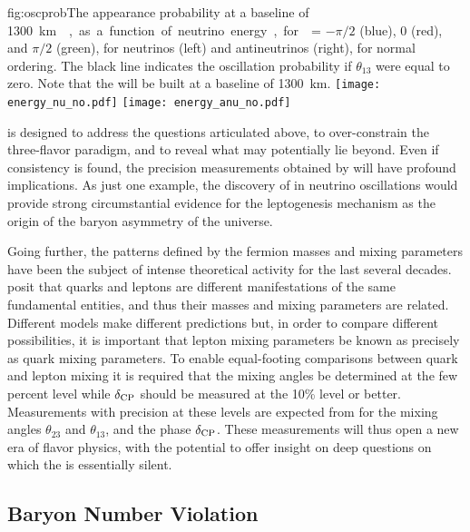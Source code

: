 \begin{dunefigure}{fig:oscprob}{The appearance probability at a baseline of \SI{1300}\km{},
  as a function of neutrino energy, for \deltacp = $-\pi/2$ (blue), 
  0 (red), and $\pi/2$ (green), for neutrinos (left) and antineutrinos
  (right), for normal ordering. The black line indicates the oscillation
  probability if $\theta_{13}$ were equal to zero. Note that the   will be built at a baseline of \SI{1300}{\km}.}
\texttt{[image: energy\_nu\_no.pdf]}
\texttt{[image: energy\_anu\_no.pdf]}
\end{dunefigure}



 is designed to address the questions articulated above, 
to over-constrain the three-flavor paradigm, 
and to reveal what may potentially lie beyond.  
Even if consistency is found, the precision measurements 
obtained by  will have profound implications. As just one example, 
the discovery of  in neutrino oscillations would provide 
strong circumstantial evidence for the leptogenesis mechanism as 
the origin of the baryon asymmetry of the universe.  

Going further, the patterns defined by the fermion masses and 
mixing parameters have been the subject of intense theoretical 
activity for the last several decades.   %
posit that quarks and leptons are different manifestations of the same 
fundamental entities, and thus their masses and mixing parameters 
are related. Different models make different predictions but, 
in order to compare different possibilities, it is important that 
lepton mixing parameters be known as precisely as quark mixing parameters.
To enable equal-footing comparisons between quark and lepton mixing 
it is required 
that the mixing angles be determined at the few percent level 
while $\delta_{\rm CP}$ should be measured at the 10\% level or better.
Measurements with precision at these levels are expected from  
for the mixing angles $\theta_{23}$ and $\theta_{13}$, 
and the  phase $\delta_{\rm CP}$.   
These measurements will thus open a new era of flavor physics, 
with the potential to offer insight on deep questions on which the 
 is essentially silent.

\subsection{Baryon Number Violation}

